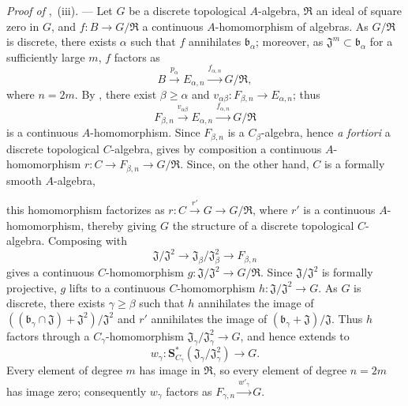 \begin{env}[19.5.6.8]
\label{0.19.5.6.8}
\emph{Proof of} ,~(iii). ---
Let $G$ be a discrete topological $A$-algebra, $\mathfrak{R}$ an ideal of square zero in $G$, and $f:B\to G/\mathfrak{R}$ a continuous $A$-homomorphism of algebras.
As $G/\mathfrak{R}$ is discrete, there exists $\alpha$ such that $f$ annihilates $\mathfrak{b}_\alpha$; moreover, as $\mathfrak{J}^m\subset\mathfrak{b}_\alpha$ for a sufficiently large $m$, $f$ factors as
\[
  B\xrightarrow{p_\alpha}E_{\alpha,n}\xrightarrow{f_{\alpha,n}}G/\mathfrak{R},
\]
where $n=2m$.
By , there exist $\beta\geq\alpha$ and $v_{\alpha\beta}:F_{\beta,n}\to E_{\alpha,n}$; thus
\begin{equation}
\label{0.19.5.6.9}
  F_{\beta,n}\xrightarrow{v_{\alpha\beta}}E_{\alpha,n}\xrightarrow{f_{\alpha,n}}G/\mathfrak{R}
  \tag{19.5.6.9}
\end{equation}
is a continuous $A$-homomorphism.
Since $F_{\beta,n}$ is a $C_\beta$-algebra, hence \emph{a fortiori} a discrete topological $C$-algebra,  gives by composition a continuous $A$-homomorphism
$r:C\to F_{\beta,n}\to G/\mathfrak{R}$.
Since, on the other hand, $C$ is a formally smooth $A$-algebra,


this homomorphism factorizes as
$r:C\xrightarrow{r'}G\to G/\mathfrak{R}$, where $r'$ is a continuous $A$-homomorphism, thereby giving $G$ the structure of a discrete topological $C$-algebra.
Composing  with
\[
  \mathfrak{J}/\mathfrak{J}^2\to\mathfrak{J}_\beta/\mathfrak{J}_\beta^2\to F_{\beta,n}
\]
gives a continuous $C$-homomorphism $g:\mathfrak{J}/\mathfrak{J}^2\to G/\mathfrak{R}$.
Since $\mathfrak{J}/\mathfrak{J}^2$ is formally projective, $g$ lifts to a continuous $C$-homomorphism $h:\mathfrak{J}/\mathfrak{J}^2\to G$.
As $G$ is discrete, there exists $\gamma\geq\beta$ such that $h$ annihilates the image of $((\mathfrak{b}_\gamma\cap\mathfrak{J})+\mathfrak{J}^2)/\mathfrak{J}^2$ and $r'$ annihilates the image of $(\mathfrak{b}_\gamma+\mathfrak{J})/\mathfrak{J}$.
Thus $h$ factors through a $C_\gamma$-homomorphism $\mathfrak{J}_\gamma/\mathfrak{J}_\gamma^2\to G$, and hence extends to
\[
  w_\gamma:\mathbf{S}_{C_\gamma}^*(\mathfrak{J}_\gamma/\mathfrak{J}_\gamma^2)\to G.
\]
Every element of degree $m$ has image in $\mathfrak{R}$, so every element of degree $n=2m$ has image zero; consequently $w_\gamma$ factors as $F_{\gamma,n}\xrightarrow{w'_\gamma}G$.


\end{env}
